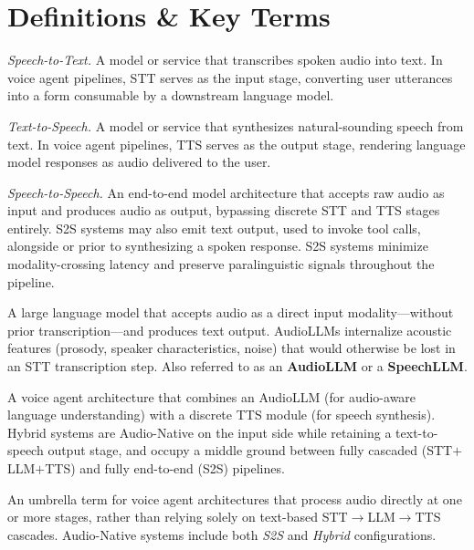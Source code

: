\section{Definitions \& Key Terms}
\label{app:definitions}

\begin{description}[leftmargin=2.2cm, labelwidth=2cm, labelsep=0.2cm, style=nextline]

  \item[\textbf{STT}] \textit{Speech-to-Text.} A model or service that transcribes spoken audio into text. In voice agent pipelines, STT serves as the input stage, converting user utterances into a form consumable by a downstream language model. \label{def:stt}

  \item[\textbf{TTS}] \textit{Text-to-Speech.} A model or service that synthesizes natural-sounding speech from text. In voice agent pipelines, TTS serves as the output stage, rendering language model responses as audio delivered to the user. \label{def:tts}


\item[\textbf{S2S}] \textit{Speech-to-Speech.} An end-to-end model architecture that accepts raw audio as input and produces audio as output, bypassing discrete STT and TTS stages entirely. S2S systems may also emit text output, used to invoke tool calls, alongside or prior to synthesizing a spoken response. S2S systems minimize modality-crossing latency and preserve paralinguistic signals throughout the pipeline. \label{def:s2s}

  \item[\textbf{LALM}] A large language model that accepts audio as a direct input modality---without prior transcription---and produces text output. AudioLLMs internalize acoustic features (prosody, speaker characteristics, noise) that would otherwise be lost in an STT transcription step. Also referred to as an \textbf{AudioLLM} or a \textbf{SpeechLLM}. \label{def:audio-llm}

  \item[\textbf{Hybrid}] A voice agent architecture that combines an AudioLLM (for audio-aware language understanding) with a discrete TTS module (for speech synthesis). Hybrid systems are Audio-Native on the input side while retaining a text-to-speech output stage, and occupy a middle ground between fully cascaded (STT$+$LLM$+$TTS) and fully end-to-end (S2S) pipelines.  \label{def:hybrid}
    
  \item[\textbf{Audio-Native}] An umbrella term for voice agent architectures that process audio directly at one or more stages, rather than relying solely on text-based STT$\to$LLM$\to$TTS cascades. Audio-Native systems include both \textit{S2S} and \textit{Hybrid} configurations.  \label{def:audio-native}


\end{description}
